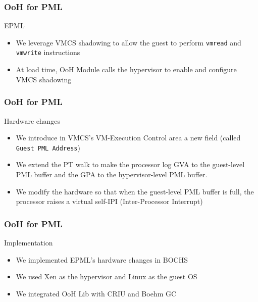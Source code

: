 \documentclass[xcolor=table,bigger,unknownkeysallowed]{beamer}
\begin{document}
        \begin{frame}
            \frametitle{OoH for PML}			
			\begin{block}{EPML}
				\begin{itemize}
					\item We leverage VMCS shadowing to allow the guest to perform \texttt{vmread} and \texttt{vmwrite} instructions
					\item At load time, OoH Module calls the hypervisor to enable and configure VMCS shadowing
				\end{itemize}
			\end{block} 
        \end{frame} 
        \begin{frame}
                \frametitle{OoH for PML}			
			\begin{block}{Hardware changes}
				\begin{itemize}
					\item We introduce in VMCS's VM-Execution Control area a new field (called \texttt{Guest PML Address})
					\item We extend the PT walk to make the processor log GVA to the guest-level PML buffer and the GPA to the hypervisor-level PML buffer.
					\item We modify the hardware so that when the guest-level PML buffer is full, the processor raises a virtual self-IPI (Inter-Processor Interrupt)
				\end{itemize}
			\end{block} 
        \end{frame}     
        \begin{frame}
            \frametitle{OoH for PML}			
			\begin{block}{Implementation}
				\begin{itemize}
					\item We implemented EPML's hardware changes in BOCHS				
					\item We used Xen as the hypervisor and Linux as the guest OS
					\item We integrated OoH Lib with CRIU and Boehm GC
				\end{itemize}
			\end{block} 
        \end{frame}
\end{document}
